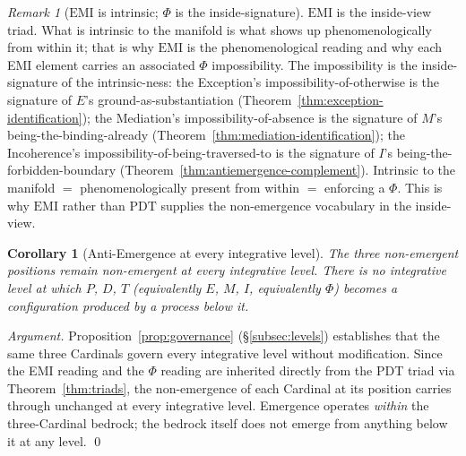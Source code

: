 \documentclass[11pt,a4paper]{article}
\newtheorem{corollary}[theorem]{Corollary}
\theoremstyle{definition}
\theoremstyle{remark}
\newtheorem{remark}[theorem]{Remark}
\begin{document}
\begin{remark}[$\mathrm{EMI}$ is intrinsic; $\Phi$ is the inside-signature]\label{rem:emi-intrinsic}
$\mathrm{EMI}$ is the inside-view triad. What is intrinsic to the manifold is what shows up phenomenologically from within it; that is why $\mathrm{EMI}$ is the phenomenological reading and why each EMI element carries an associated $\Phi$ impossibility. The impossibility is the inside-signature of the intrinsic-ness: the Exception's impossibility-of-otherwise is the signature of $E$'s ground-as-substantiation (Theorem~\ref{thm:exception-identification}); the Mediation's impossibility-of-absence is the signature of $M$'s being-the-binding-already (Theorem~\ref{thm:mediation-identification}); the Incoherence's impossibility-of-being-traversed-to is the signature of $I$'s being-the-forbidden-boundary (Theorem~\ref{thm:antiemergence-complement}). Intrinsic to the manifold $=$ phenomenologically present from within $=$ enforcing a $\Phi$. This is why $\mathrm{EMI}$ rather than $\mathrm{PDT}$ supplies the non-emergence vocabulary in the inside-view.
\end{remark}

\begin{corollary}[Anti-Emergence at every integrative level]\label{cor:antiemergence-levels}
The three non-emergent positions remain non-emergent at every integrative level. There is no integrative level at which $P$, $D$, $T$ (equivalently $E$, $M$, $I$, equivalently $\Phi$) becomes a configuration produced by a process below it.
\end{corollary}

\begin{proof}[Argument]
Proposition~\ref{prop:governance} (\S\ref{subsec:levels}) establishes that the same three Cardinals govern every integrative level without modification. Since the EMI reading and the $\Phi$ reading are inherited directly from the PDT triad via Theorem~\ref{thm:triads}, the non-emergence of each Cardinal at its position carries through unchanged at every integrative level. Emergence operates \emph{within} the three-Cardinal bedrock; the bedrock itself does not emerge from anything below it at any level. \qed
\end{proof}
\end{document}
